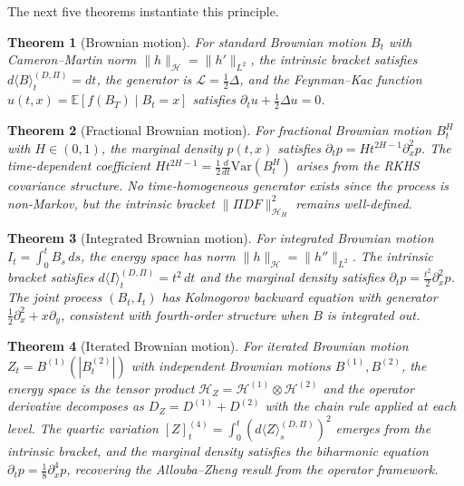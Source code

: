 \documentclass[11pt]{article}
\newtheorem{theorem}{Theorem}[section]
\theoremstyle{definition}
\newcommand{\E}{\mathbb{E}}
\newcommand{\Hi}{\mathcal{H}}
\begin{document}
The next five theorems instantiate this principle.

\begin{theorem}[Brownian motion]\label{thm:main-bm}
For standard Brownian motion $B_t$ with Cameron--Martin norm $\|h\|_\Hi = \|h'\|_{L^2}$, the intrinsic bracket satisfies $d\langle B \rangle^{(D,\Pi)}_t = dt$, the generator is $\mathcal{L} = \frac{1}{2}\Delta$, and the Feynman--Kac function $u(t,x) = \E[f(B_T) \mid B_t = x]$ satisfies $\partial_t u + \frac{1}{2}\Delta u = 0$.
\end{theorem}

\begin{theorem}[Fractional Brownian motion]\label{thm:main-fbm}
For fractional Brownian motion $B^H_t$ with $H \in (0,1)$, the marginal density $p(t,x)$ satisfies $\partial_t p = Ht^{2H-1} \partial_x^2 p$. The time-dependent coefficient $Ht^{2H-1} = \frac{1}{2}\frac{d}{dt}\mathrm{Var}(B^H_t)$ arises from the RKHS covariance structure. No time-homogeneous generator exists since the process is non-Markov, but the intrinsic bracket $\|\Pi D F\|^2_{\Hi_H}$ remains well-defined.
\end{theorem}

\begin{theorem}[Integrated Brownian motion]\label{thm:main-ibm}
For integrated Brownian motion $I_t = \int_0^t B_s\,ds$, the energy space has norm $\|h\|_\Hi = \|h''\|_{L^2}$. The intrinsic bracket satisfies $d\langle I \rangle^{(D,\Pi)}_t = t^2\,dt$ and the marginal density satisfies $\partial_t p = \frac{t^2}{2} \partial_x^2 p$. The joint process $(B_t, I_t)$ has Kolmogorov backward equation with generator $\frac{1}{2}\partial_x^2 + x\partial_y$, consistent with fourth-order structure when $B$ is integrated out.
\end{theorem}

\begin{theorem}[Iterated Brownian motion]\label{thm:main-iterated}
For iterated Brownian motion $Z_t = B^{(1)}(|B^{(2)}_t|)$ with independent Brownian motions $B^{(1)}, B^{(2)}$, the energy space is the tensor product $\Hi_Z = \Hi^{(1)} \otimes \Hi^{(2)}$ and the operator derivative decomposes as $D_Z = D^{(1)} + D^{(2)}$ with the chain rule applied at each level. The quartic variation $[Z]^{(4)}_t = \int_0^t (d\langle Z\rangle^{(D,\Pi)}_s)^2$ emerges from the intrinsic bracket, and the marginal density satisfies the biharmonic equation $\partial_t p = \frac{1}{8}\partial_x^4 p$, recovering the Allouba--Zheng result \cite{AlloubaZheng2001} from the operator framework.
\end{theorem}
\end{document}
